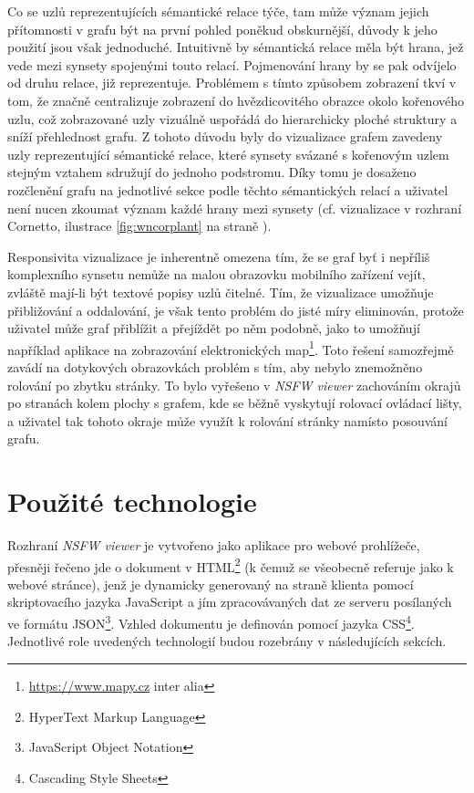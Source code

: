 \documentclass[a4paper, 11pt, oneside]{book}
\newcommand{\simplywn}{\textit{NSFW viewer} }
\begin{document}
				Co se uzlů reprezentujících sémantické relace týče, tam může význam jejich přítomnosti v grafu být na první pohled poněkud obskurnější, důvody k jeho použití jsou však jednoduché. Intuitivně by sémantická relace měla být hrana, jež vede mezi synsety spojenými touto relací. Pojmenování hrany by se pak odvíjelo od druhu relace, již reprezentuje. Problémem s tímto způsobem zobrazení tkví v tom, že značně centralizuje zobrazení do hvězdicovitého obrazce okolo kořenového uzlu, což zobrazované uzly vizuálně uspořádá do hierarchicky ploché struktury a sníží přehlednost grafu. Z tohoto důvodu byly do vizualizace grafem zavedeny uzly reprezentující sémantické relace, které synsety svázané s kořenovým uzlem stejným vztahem sdružují do jednoho podstromu. Díky tomu je dosaženo rozčlenění grafu na jednotlivé sekce podle těchto sémantických relací a uživatel není nucen zkoumat význam každé hrany mezi synsety (cf. vizualizace v rozhraní Cornetto, ilustrace \ref{fig:wncorplant} na straně \pageref{fig:wncorplant}).

				Responsivita vizualizace je inherentně omezena tím, že se graf byť i nepříliš komplexního synsetu nemůže na malou obrazovku mobilního zařízení vejít, zvláště mají-li být textové popisy uzlů čitelné. Tím, že vizualizace umožňuje přibližování a oddalování, je však tento problém do jisté míry eliminován, protože uživatel může graf přiblížit a přejíždět po něm podobně, jako to umožňují například aplikace na zobrazování elektronických map\footnote{\url{https://www.mapy.cz} inter alia}. Toto řešení samozřejmě zavádí na dotykových obrazovkách problém s tím, aby nebylo znemožněno rolování po zbytku stránky. To bylo vyřešeno v \simplywn zachováním okrajů po stranách kolem plochy s grafem, kde se běžně vyskytují rolovací ovládací lišty, a uživatel tak tohoto okraje může využít k rolování stránky namísto posouvání grafu.


		\chapter{Použité technologie}
		\label{cha:techno}

			Rozhraní \simplywn je vytvořeno jako aplikace pro webové prohlížeče, přesněji řečeno jde o dokument v HTML\footnote{HyperText Markup Language} (k čemuž se všeobecně referuje jako k webové stránce), jenž je dynamicky generovaný na straně klienta pomocí skriptovacího jazyka JavaScript a jím zpracovávaných dat ze serveru posílaných ve formátu JSON\footnote{JavaScript Object Notation}. Vzhled dokumentu je definován pomocí jazyka CSS\footnote{Cascading Style Sheets}. Jednotlivé role uvedených technologií budou rozebrány v následujících sekcích.
\end{document}
